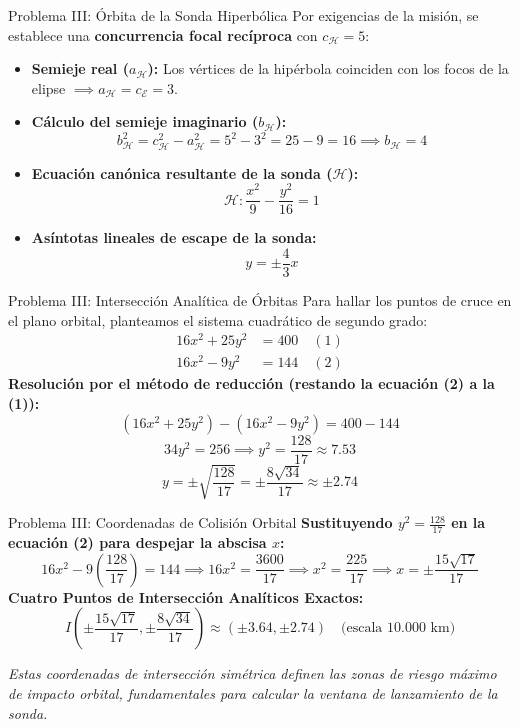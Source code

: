 \documentclass[aspectratio=169]{beamer}
\begin{document}
\begin{frame}{Problema III: Órbita de la Sonda Hiperbólica}
  Por exigencias de la misión, se establece una \textbf{concurrencia focal recíproca} con $c_{\mathcal{H}} = 5$:
  \vspace{0.2cm}
  \begin{itemize}
    \item \textbf{Semieje real ($a_{\mathcal{H}}$):} Los vértices de la hipérbola coinciden con los focos de la elipse $\implies a_{\mathcal{H}} = c_{\mathcal{E}} = 3$.
    \item \textbf{Cálculo del semieje imaginario ($b_{\mathcal{H}}$):}
      \[b_{\mathcal{H}}^2 = c_{\mathcal{H}}^2 - a_{\mathcal{H}}^2 = 5^2 - 3^2 = 25 - 9 = 16 \implies b_{\mathcal{H}} = 4\]
    \item \textbf{Ecuación canónica resultante de la sonda ($\mathcal{H}$):}
      \[\mathcal{H} \colon \frac{x^2}{9} - \frac{y^2}{16} = 1\]
    \item \textbf{Asíntotas lineales de escape de la sonda:}
      \[y = \pm \frac{4}{3}x\]
  \end{itemize}
\end{frame}

\begin{frame}{Problema III: Intersección Analítica de Órbitas}
  Para hallar los puntos de cruce en el plano orbital, planteamos el sistema cuadrático de segundo grado:
  \begin{align*}
    16x^2 + 25y^2 &= 400 \quad (1) \\
    16x^2 - 9y^2 &= 144 \quad (2)
  \end{align*}
  \vspace{0.2cm}
  \textbf{Resolución por el método de reducción (restando la ecuación (2) a la (1)):}
  \[(16x^2 + 25y^2) - (16x^2 - 9y^2) = 400 - 144\]
  \[34y^2 = 256 \implies y^2 = \frac{128}{17} \approx 7.53\]
  \[y = \pm \sqrt{\frac{128}{17}} = \pm \frac{8\sqrt{34}}{17} \approx \pm 2.74\]
\end{frame}

\begin{frame}{Problema III: Coordenadas de Colisión Orbital}
  \textbf{Sustituyendo $y^2 = \frac{128}{17}$ en la ecuación (2) para despejar la abscisa $x$:}
  \[16x^2 - 9\left(\frac{128}{17}\right) = 144 \implies 16x^2 = \frac{3600}{17} \implies x^2 = \frac{225}{17} \implies x = \pm \frac{15\sqrt{17}}{17}\]
  \vspace{0.25cm}
  \textbf{Cuatro Puntos de Intersección Analíticos Exactos:}
  \[I \left( \pm \frac{15\sqrt{17}}{17}, \pm \frac{8\sqrt{34}}{17} \right) \approx (\pm 3.64, \pm 2.74) \quad \text{(escala } 10.000\text{ km)}\]
  \vspace{0.2cm}
  {\centering \scriptsize \textit{Estas coordenadas de intersección simétrica definen las zonas de riesgo máximo de impacto orbital, fundamentales para calcular la ventana de lanzamiento de la sonda.} \par}
\end{frame}
\end{document}
